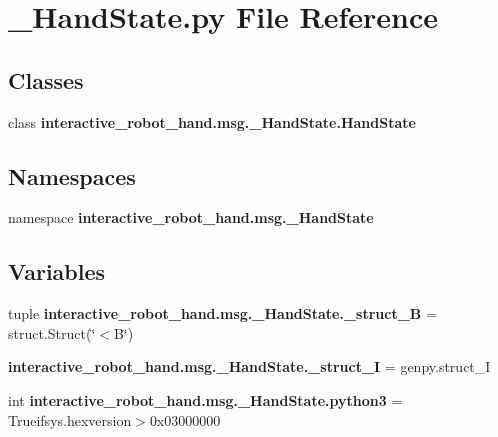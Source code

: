 \section{\-\_\-\-Hand\-State.\-py File Reference}
\label{__HandState_8py}
\subsection*{Classes}
\begin{DoxyCompactItemize}
\item 
class {\bf interactive\-\_\-robot\-\_\-hand.\-msg.\-\_\-\-Hand\-State.\-Hand\-State}
\end{DoxyCompactItemize}
\subsection*{Namespaces}
\begin{DoxyCompactItemize}
\item 
namespace {\bf interactive\-\_\-robot\-\_\-hand.\-msg.\-\_\-\-Hand\-State}
\end{DoxyCompactItemize}
\subsection*{Variables}
\begin{DoxyCompactItemize}
\item 
tuple {\bf interactive\-\_\-robot\-\_\-hand.\-msg.\-\_\-\-Hand\-State.\-\_\-struct\-\_\-\-B} = struct.\-Struct(\char`\"{}$<$B\char`\"{})
\item 
{\bf interactive\-\_\-robot\-\_\-hand.\-msg.\-\_\-\-Hand\-State.\-\_\-struct\-\_\-\-I} = genpy.\-struct\-\_\-\-I
\item 
int {\bf interactive\-\_\-robot\-\_\-hand.\-msg.\-\_\-\-Hand\-State.\-python3} = Trueifsys.\-hexversion$>$0x03000000
\end{DoxyCompactItemize}
